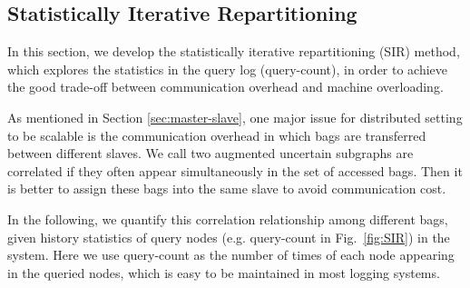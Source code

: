 \subsection{Statistically Iterative Repartitioning}
\label{sec:SIR}
In this section, we develop the statistically iterative repartitioning (SIR) method, which explores the statistics in the query log (query-count), in order to achieve the good trade-off between communication overhead and machine overloading.

As mentioned in Section \ref{sec:master-slave}, one major issue for distributed setting to be scalable is the communication overhead in which bags are transferred between different slaves.
We call two augmented uncertain subgraphs are correlated if they often appear simultaneously in the set of accessed bags. Then 
it is better to assign these bags into the same slave to avoid communication cost. 

In the following, we quantify this correlation relationship among different bags, given history statistics of query nodes (e.g. query-count in Fig.~\ref{fig:SIR}) in the system. Here we use query-count as the number of times of each node appearing in the queried nodes, which is easy to be maintained in most logging systems.

